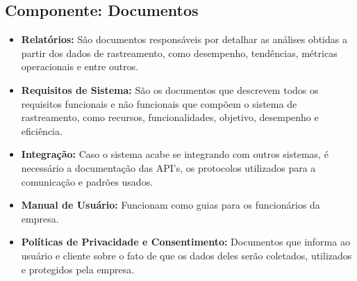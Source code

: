      \subsection{Componente: Documentos }
     \begin{itemize}
     \item \textbf{Relatórios:} São documentos responsáveis por detalhar as análises obtidas a partir dos dados de rastreamento, como desempenho, tendências, métricas operacionais e entre outros.
     
     \item \textbf{Requisitos de Sistema:} São os documentos que descrevem todos os requisitos funcionais e não funcionais que compõem o sistema de rastreamento, como recursos, funcionalidades, objetivo, desempenho e eficiência.
     
     \item \textbf{Integração:} Caso o sistema acabe se integrando com outros sistemas, é necessário a documentação das API's, os protocolos utilizados para a comunicação e padrões usados.
     
     \item \textbf{Manual de Usuário:} Funcionam como guias para os funcionários da empresa.
     
     \item \textbf{Políticas de Privacidade e Consentimento:} Documentos que informa ao usuário e cliente sobre o fato de que os dados deles serão coletados, utilizados e protegidos pela empresa.
     	
     	
     \end{itemize}

